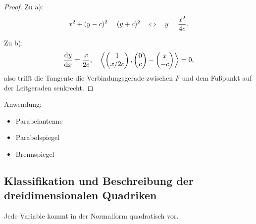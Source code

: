 \documentclass[
 a4paper,
 12pt,
 parskip=half
 ]{scrartcl}
\theoremstyle{plain}
\theoremstyle{definition}
\begin{document}
\begin{proof}
  Zu a):
  \[ x^2 + (y-c)^2 = (y+c)^2 \quad \Leftrightarrow \quad y = \frac{x^2}{4c}. \]

  Zu b):
  \[ \frac{\mathrm{d} y}{\mathrm{d} x} = \frac{x}{2c}, \quad \left\langle \begin{pmatrix}1 \\ x/2c\end{pmatrix},
      \begin{pmatrix}0\\c\end{pmatrix}-\begin{pmatrix}x\\-c\end{pmatrix} \right\rangle = 0, \]
  also trifft die Tangente die Verbindungsgerade zwischen $F$ und dem Fußpunkt
  auf der Leitgeraden senkrecht.
\end{proof}

Anwendung:
\begin{itemize}
  \item Parabelantenne
  \item Parabolspiegel
  \item Brennspiegel
\end{itemize}

\subsection{Klassifikation und Beschreibung der dreidimensionalen Quadriken}
Jede Variable kommt in der Normalform quadratisch vor.
\end{document}
